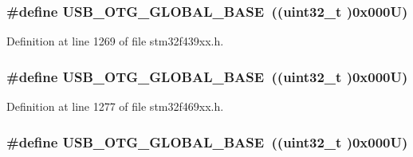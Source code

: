 \subsubsection[{\texorpdfstring{U\+S\+B\+\_\+\+O\+T\+G\+\_\+\+G\+L\+O\+B\+A\+L\+\_\+\+B\+A\+SE}{USB_OTG_GLOBAL_BASE}}]{\setlength{\rightskip}{0pt plus 5cm}\#define U\+S\+B\+\_\+\+O\+T\+G\+\_\+\+G\+L\+O\+B\+A\+L\+\_\+\+B\+A\+SE~((uint32\+\_\+t )0x000\+U)}\hypertarget{group___peripheral__memory__map_ga044aa4388e72d9d47a03f387fb8926fb}{}\label{group___peripheral__memory__map_ga044aa4388e72d9d47a03f387fb8926fb}


Definition at line 1269 of file stm32f439xx.\+h.

\subsubsection[{\texorpdfstring{U\+S\+B\+\_\+\+O\+T\+G\+\_\+\+G\+L\+O\+B\+A\+L\+\_\+\+B\+A\+SE}{USB_OTG_GLOBAL_BASE}}]{\setlength{\rightskip}{0pt plus 5cm}\#define U\+S\+B\+\_\+\+O\+T\+G\+\_\+\+G\+L\+O\+B\+A\+L\+\_\+\+B\+A\+SE~((uint32\+\_\+t )0x000\+U)}\hypertarget{group___peripheral__memory__map_ga044aa4388e72d9d47a03f387fb8926fb}{}\label{group___peripheral__memory__map_ga044aa4388e72d9d47a03f387fb8926fb}


Definition at line 1277 of file stm32f469xx.\+h.

\subsubsection[{\texorpdfstring{U\+S\+B\+\_\+\+O\+T\+G\+\_\+\+G\+L\+O\+B\+A\+L\+\_\+\+B\+A\+SE}{USB_OTG_GLOBAL_BASE}}]{\setlength{\rightskip}{0pt plus 5cm}\#define U\+S\+B\+\_\+\+O\+T\+G\+\_\+\+G\+L\+O\+B\+A\+L\+\_\+\+B\+A\+SE~((uint32\+\_\+t )0x000\+U)}\hypertarget{group___peripheral__memory__map_ga044aa4388e72d9d47a03f387fb8926fb}{}\label{group___peripheral__memory__map_ga044aa4388e72d9d47a03f387fb8926fb}


